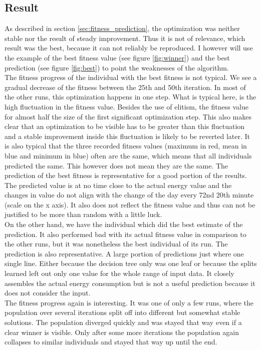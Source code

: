 \documentclass[conference]{IEEEtran}
\begin{document}
\subsection{Result}
As described in section \ref{sec:fitness_prediction}, the optimization was neither stable nor the result of steady improvement. Thus it is not of relevance, which result was the best, because it can not reliably be reproduced. I however will use the example of the best fitness value (see figure \ref{fig:winner}) and the best prediction (see figure \ref{fig:best}) to point the weaknesses of the algorithm.\\
The fitness progress of the individual with the best fitness is not typical. We see a gradual decrease of the fitness between the 25th and 50th iteration. In most of the other runs, this optimization happens in one step. What is typical here, is the high fluctuation in the fitness value. Besides the use of elitism, the fitness value for almost half the size of the first significant optimization step. This also makes clear that an optimization to be visible has to be greater than this fluctuation and a stable improvement inside this fluctuation is likely to be reverted later. It is also typical that the three recorded fitness values (maximum in red, mean in blue and minimum in blue) often are the same, which means that all individuals predicted the same. This however does not mean they are the same. The prediction of the best fitness is representative for a good portion of the results. The predicted value is at no time close to the actual energy value and the changes in value do not align with the change of the day every 72nd 20th minute (scale on the x axis). It also does not reflect the fitness value and thus can not be justified to be more than random with a little luck.\\
On the other hand, we have the individual which did the best estimate of the prediction. It also performed bad with its actual fitness value in comparison to the other runs, but it was nonetheless the best individual of its run. The prediction is also representative. A large portion of predictions just where one single line. Either because the decision tree only was one leaf or because the splits learned left out only one value for the whole range of input data. It closely assembles the actual energy consumption but is not a useful prediction because it does not consider the input.\\
The fitness progress again is interesting. It was one of only a few runs, where the population over several iterations split off into different but somewhat stable solutions. The population diverged quickly and was stayed that way even if a clear winner is visible. Only after some more iterations the population again collapses to similar individuals and stayed that way up until the end.
\end{document}
